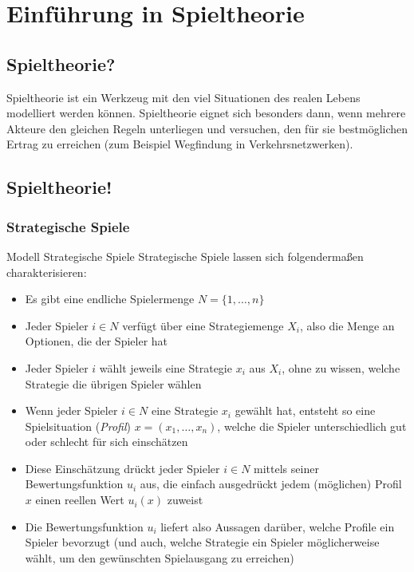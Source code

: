\documentclass{panikzettel}
\begin{document}
\newpage
\section{Einführung in Spieltheorie}

\subsection{Spieltheorie?}

Spieltheorie ist ein Werkzeug mit den viel Situationen des realen Lebens modelliert werden können. Spieltheorie eignet sich besonders dann, wenn mehrere Akteure den gleichen Regeln unterliegen und versuchen, den für sie bestmöglichen Ertrag zu erreichen (zum Beispiel Wegfindung in Verkehrsnetzwerken).

\subsection{Spieltheorie!}

\subsubsection{Strategische Spiele}

\begin{defi}{Modell Strategische Spiele}
	Strategische Spiele lassen sich folgendermaßen charakterisieren:
	
	\begin{itemize}
		\item Es gibt eine endliche Spielermenge $N = \{1, \dots, n \}$
		\item Jeder Spieler $i \in N$ verfügt über eine Strategiemenge $X_i$, also die Menge an Optionen, die der Spieler hat
		\item Jeder Spieler $i$ wählt jeweils eine Strategie $x_i$ aus $X_i$, ohne zu wissen, welche Strategie die übrigen Spieler wählen
		\item Wenn jeder Spieler $i \in N$ eine Strategie $x_i$ gewählt hat, entsteht so eine Spielsituation (\emph{Profil}) $ x = (x_1, \dots , x_n)$, welche die Spieler unterschiedlich gut oder schlecht für sich einschätzen
		\item Diese Einschätzung drückt jeder Spieler $i \in N$ mittels seiner Bewertungsfunktion $u_i$ aus, die einfach ausgedrückt jedem (möglichen) Profil $x$ einen reellen Wert $u_i(x)$ zuweist 
		\item Die Bewertungsfunktion $u_i$ liefert also Aussagen darüber, welche Profile ein Spieler bevorzugt (und auch, welche Strategie ein Spieler möglicherweise wählt, um den gewünschten Spielausgang zu erreichen)
	\end{itemize}
\end{defi}
\end{document}
